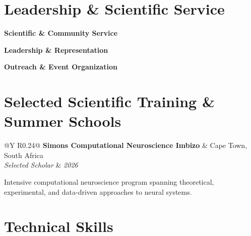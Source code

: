 \documentclass[10pt,a4paper]{article}
\makeatletter
\newcommand{\cventry}[4]{%
    \Needspace{3\baselineskip}
    \begin{tabularx}{\textwidth}{@{}Y R{0.24\textwidth}@{}}
        \textbf{#1} & {\small #2} \\
        \textit{#3} & {\small\textit{#4}}
    \end{tabularx}
}
\newcommand{\cvdetail}[1]{%
    \vspace{-4pt}
    {\small\color{cvgray} #1\par}
    \vspace{6pt}
}
\newcommand{\cvpubcategory}[1]{%
    \Needspace{3\baselineskip}
    \vspace{3pt}
    {\normalsize\bfseries #1\par}
    \vspace{3pt}
}
\makeatother
\begin{document}
\section{Leadership \& Scientific Service}


\cvpubcategory{Scientific \& Community Service}

\serviceMNE
\serviceTuNA
\serviceMilitaryAIReadingGroup
\serviceMilitaryAIWorkshop
\serviceUNIQUE
\serviceModeratorUNIQUE
\serviceCuttingEEG
\serviceModeratorMAIN


\cvpubcategory{Leadership \& Representation}

\serviceIEEE
\serviceSUPCOMRepresentative

\cvpubcategory{Outreach \& Event Organization}

\serviceEntrepreneurshipSummit
\serviceSmartGreenTunisia
\serviceHackForEarth
\serviceIndabaX
\serviceRightsCon
\servicePACTE
\serviceCoding

\section{Selected Scientific Training \& Summer Schools}

\cventry
    {Simons Computational Neuroscience Imbizo}
    {Cape Town, South Africa}
    {Selected Scholar}
    {2026}

\cvdetail{
    Intensive computational neuroscience program spanning theoretical,
    experimental, and data-driven approaches to neural systems.
}

\section{Technical Skills}

\skillsNeuro
\skillsML
\skillsProgramming
\skillsHPC
\skillsSoftware
\skillsLanguages
\end{document}

